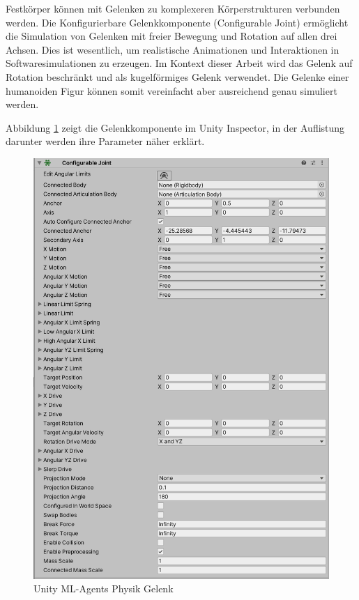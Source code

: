 Festkörper können mit Gelenken zu komplexeren Körperstrukturen verbunden werden. Die Konfigurierbare Gelenkkomponente (Configurable Joint) ermöglicht die Simulation von Gelenken mit freier Bewegung und Rotation auf allen drei Achsen. Dies ist wesentlich, um realistische Animationen und Interaktionen in Softwaresimulationen zu erzeugen. Im Kontext dieser Arbeit wird das Gelenk auf Rotation beschränkt und als kugelförmiges Gelenk verwendet. Die Gelenke einer humanoiden Figur können somit vereinfacht aber ausreichend genau simuliert werden.

Abbildung \ref{fig:komponente_configurable_joint} zeigt die Gelenkkomponente im Unity Inspector, in der Auflistung darunter werden ihre Parameter näher erklärt.

\begin{figure}[H]
  \centering
  \includegraphics[scale=0.5]{img/komponente_configurable_joint}
  \caption{Unity ML-Agents Physik Gelenk}
  \label{fig:komponente_configurable_joint}
\end{figure}
